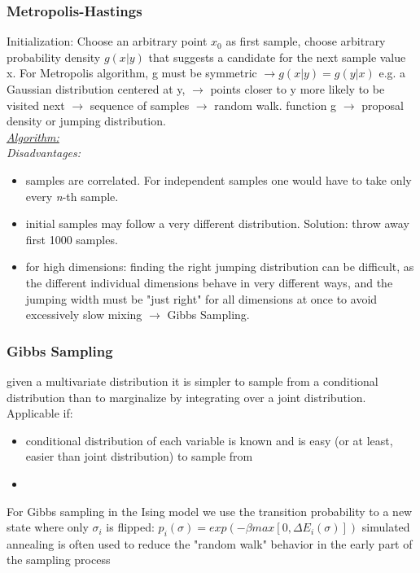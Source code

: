 \documentclass[9pt,parskip]{scrartcl}
\begin{document}
\begin{multicols*}{4}
\subsubsection*{Metropolis-Hastings}
Initialization: Choose an arbitrary point $x_0$ as first sample, choose arbitrary probability density $g(x|y)$ that suggests a candidate for the next sample value x. For Metropolis algorithm, g must be symmetric $\to g(x|y)=g(y|x)$ e.g. a Gaussian distribution centered at y, $\to$ points closer to y more likely to be visited next $\to$ sequence of samples $\to$ random walk. function g $\to$ proposal density or jumping distribution. \\
\underline{\textit{Algorithm: }} \\
\textit{Disadvantages:}
\begin{itemize}
	\item samples are correlated. For independent samples one would have to take only every \textit{n}-th sample.
	\item initial samples may follow a very different distribution. Solution: throw away first 1000 samples.
	\item  for high dimensions: finding the right jumping distribution can be difficult, as the different individual dimensions behave in very different ways, and the jumping width must be "just right" for all dimensions at once to avoid excessively slow mixing $\to$ Gibbs Sampling.
\end{itemize}

\subsubsection*{Gibbs Sampling}
given a multivariate distribution it is simpler to sample from a conditional distribution than to marginalize by integrating over a joint distribution. \\
Applicable if:
\begin{itemize}
	\item conditional distribution of each variable is known and is easy (or at least, easier than joint distribution) to sample from
	\item 
\end{itemize}
For Gibbs sampling in the Ising model we use the transition probability to a new state where only $\sigma_i$ is flipped: $p_i(\sigma) = exp(-\beta max[0,\Delta E_i(\sigma)])$ 
 simulated annealing is often used to reduce the "random walk" behavior in the early part of the sampling process


\end{multicols*}
\end{document}
